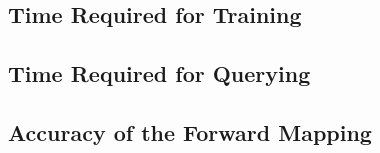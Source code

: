 
\subsection{Time Required for Training}





\subsection{Time Required for Querying}





\subsection{Accuracy of the Forward Mapping}

